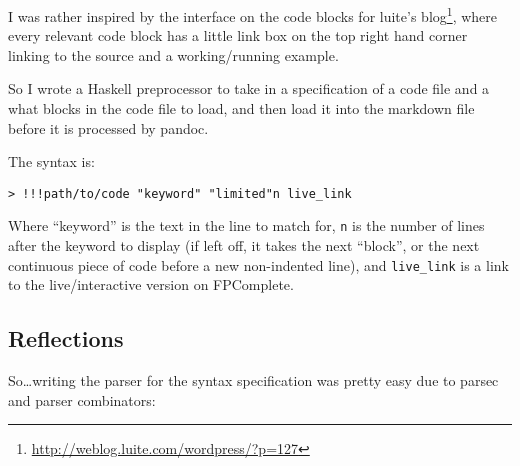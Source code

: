 \documentclass[]{article}
\renewcommand{\href}[2]{#2\footnote{\url{#1}}}
\begin{document}
I was rather inspired by the interface on the code blocks for
\href{http://weblog.luite.com/wordpress/?p=127}{luite's blog}, where every
relevant code block has a little link box on the top right hand corner linking
to the source and a working/running example.

So I wrote a Haskell preprocessor to take in a specification of a code file and
a what blocks in the code file to load, and then load it into the markdown file
before it is processed by pandoc.

The syntax is:

\begin{verbatim}
> !!!path/to/code "keyword" "limited"n live_link
\end{verbatim}

Where ``keyword'' is the text in the line to match for, \texttt{n} is the number
of lines after the keyword to display (if left off, it takes the next ``block'',
or the next continuous piece of code before a new non-indented line), and
\texttt{live\_link} is a link to the live/interactive version on FPComplete.

\subsection{Reflections}\label{reflections}

So\ldots writing the parser for the syntax specification was pretty easy due to
parsec and parser combinators:
\end{document}
